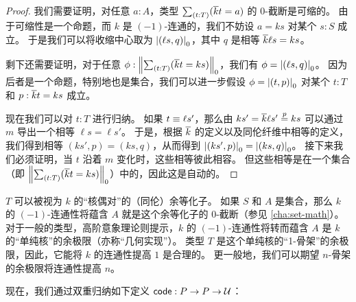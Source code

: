 \begin{proof}
  我们需要证明，对任意 $a:A$，类型 $\sm{t:T}(\kbar t = a)$ 的 0-截断是可缩的。
  由于可缩性是一个命题，而 $k$ 是 $(-1)$-连通的，我们不妨设 $a=ks$ 对某个 $s:S$ 成立。
  于是我们可以将收缩中心取为 $\tproj0{(\ell s,q)}$，其中 $q$ 是相等 $\kbar\ell s = k s$。

  剩下还需要证明，对于任意 $\phi:\trunc0{\sm{t:T} (\kbar t = ks)}$，我们有 $\phi = \tproj0{(\ell s,q)}$。
  因为后者是一个命题，特别地也是集合，我们可以进一步假设 $\phi=\tproj0{(t,p)}$ 对某个 $t:T$ 和 $p:\kbar t = ks$ 成立。

  现在我们可以对 $t:T$ 进行归纳。
  如果 $t\jdeq\ell s'$，那么由 $ks' = \kbar \ell s' \overset{p}{=} ks$ 可以通过 $m$ 导出一个相等 $\ell s = \ell s'$。
  于是，根据 $\kbar$ 的定义以及同伦纤维中相等的定义，我们得到相等 $(ks',p) = (ks,q)$，从而得到 $\tproj0{(ks',p)} = \tproj0{(ks,q)}$。
  接下来我们必须证明，当 $t$ 沿着 $m$ 变化时，这些相等彼此相容。
  但这些相等是在一个集合（即 $\trunc0{\sm{t:T} (\kbar t = ks)}$）中的，因此这是自动的。
\end{proof}

\begin{rmk}
  $T$ 可以被视为 $k$ 的``核偶对''的（同伦）余等化子。
  如果 $S$ 和 $A$ 是集合，那么 $k$ 的 $(-1)$-连通性将蕴含 $A$ 就是这个余等化子的 $0$-截断（参见 \cref{cha:set-math}）。
  对于一般的类型，高阶意象理论则提示，$k$ 的 $(-1)$-连通性将转而蕴含 $A$ 是 $k$ 的``单纯核''的余极限（亦称``几何实现''）。
  类型 $T$ 是这个单纯核的``1-骨架''的余极限，因此，它能将 $k$ 的连通性提高 $1$ 是合理的。
  更一般地，我们可以期望 $n$-骨架的余极限将连通性提高 $n$。
\end{rmk}

%

现在，我们通过双重归纳如下定义 $\code:P\to P\to \type$：

